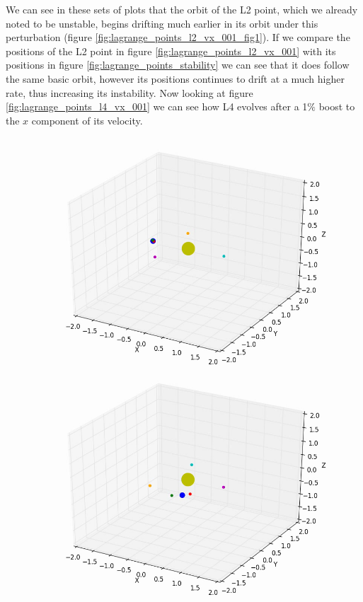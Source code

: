 \documentclass[10pt,letterpaper]{article}
\begin{document}
We can see in these sets of plots that the orbit of the L2 point, which we already noted to be unstable, begins drifting much earlier in its orbit under this perturbation (figure \ref{fig:lagrange_points_l2_vx_001_fig1}). If we compare the positions of the L2 point in figure \ref{fig:lagrange_points_l2_vx_001} with its positions in figure \ref{fig:lagrange_points_stability} we can see that it does follow the same basic orbit, however its positions continues to drift at a much higher rate, thus increasing its instability. Now looking at figure \ref{fig:lagrange_points_l4_vx_001} we can see how L4 evolves after a 1$\%$ boost to the $x$ component of its velocity.\\
\pagebreak
\begin{figure}[!htb]
  \includegraphics[width=\linewidth]{figures/lagrange_points/lagrange_points_l4_vx_001_1.png}
  \subcaption{}\label{fig:lagrange_points_l4_vx_001_fig1}
\endminipage\hfill
{}
  \includegraphics[width=\linewidth]{figures/lagrange_points/lagrange_points_l4_vx_001_2.png}

\end{figure}
\end{document}
